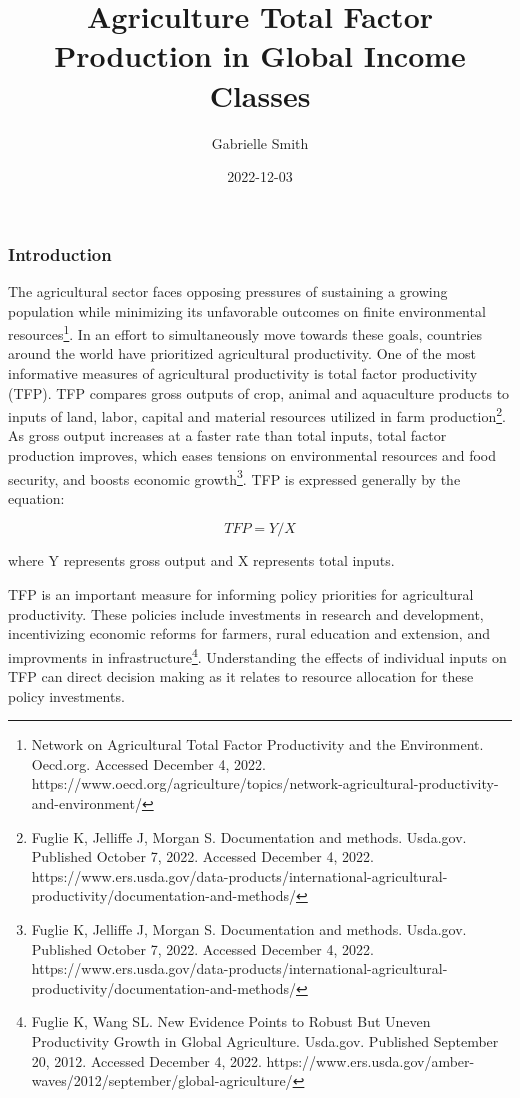 \documentclass[
  letterpaper,
  DIV=11,
  numbers=noendperiod]{scrartcl}
\title{Agriculture Total Factor Production in Global Income Classes}
\author{Gabrielle Smith}
\date{2022-12-03}
\renewcommand*\contentsname{Table of contents}
\newcommand\contentsname{Table of contents}
\begin{document}
\maketitle
\ifdefined\Shaded\renewenvironment{Shaded}{\begin{tcolorbox}[borderline west={3pt}{0pt}{shadecolor}, sharp corners, boxrule=0pt, interior hidden, enhanced, frame hidden, breakable]}{\end{tcolorbox}}\fi

\renewcommand*\contentsname{Table of contents}
{
\hypersetup{linkcolor=}
\setcounter{tocdepth}{3}
\tableofcontents
}
\hypertarget{introduction}{%
\subsubsection{Introduction}\label{introduction}}

The agricultural sector faces opposing pressures of sustaining a growing
population while minimizing its unfavorable outcomes on finite
environmental resources\footnote{Network on Agricultural Total Factor
  Productivity and the Environment. Oecd.org. Accessed December 4, 2022.
  https://www.oecd.org/agriculture/topics/network-agricultural-productivity-and-environment/}.
In an effort to simultaneously move towards these goals, countries
around the world have prioritized agricultural productivity. One of the
most informative measures of agricultural productivity is total factor
productivity (TFP). TFP compares gross outputs of crop, animal and
aquaculture products to inputs of land, labor, capital and material
resources utilized in farm production\footnote{Fuglie K, Jelliffe J,
  Morgan S. Documentation and methods. Usda.gov. Published October 7,
  2022. Accessed December 4, 2022.
  https://www.ers.usda.gov/data-products/international-agricultural-productivity/documentation-and-methods/}.
As gross output increases at a faster rate than total inputs, total
factor production improves, which eases tensions on environmental
resources and food security, and boosts economic growth\footnote{Fuglie
  K, Jelliffe J, Morgan S. Documentation and methods. Usda.gov.
  Published October 7, 2022. Accessed December 4, 2022.
  https://www.ers.usda.gov/data-products/international-agricultural-productivity/documentation-and-methods/}.
TFP is expressed generally by the equation:

\[TFP = Y/X\]

where Y represents gross output and X represents total inputs.

TFP is an important measure for informing policy priorities for
agricultural productivity. These policies include investments in
research and development, incentivizing economic reforms for farmers,
rural education and extension, and improvments in
infrastructure\footnote{Fuglie K, Wang SL. New Evidence Points to Robust
  But Uneven Productivity Growth in Global Agriculture. Usda.gov.
  Published September 20, 2012. Accessed December 4, 2022.
  https://www.ers.usda.gov/amber-waves/2012/september/global-agriculture/}.
Understanding the effects of individual inputs on TFP can direct
decision making as it relates to resource allocation for these policy
investments.
\end{document}
